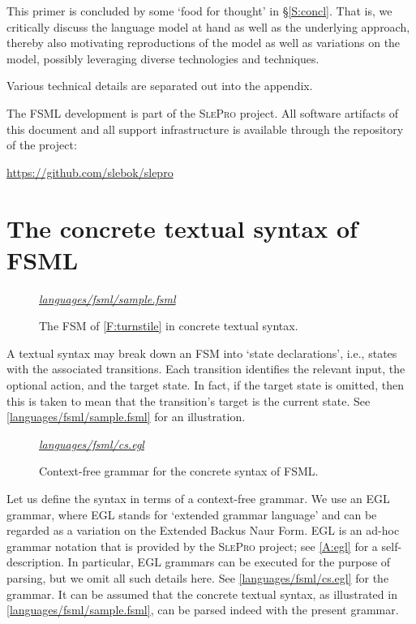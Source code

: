 \documentclass[preprint,authoryear,12pt]{noelsarticle}
\newcommand{\slepro}{\textsc{SlePro}}
\newcommand{\codefigure}[3]{
\begin{figure}[t!]
\begin{boxedminipage}{\hsize}
\mbox{}\hfill{}{\small\textit{\href{http://github.com/slebok/slepro/tree/master/#2}{#2}}}

\end{boxedminipage}
\caption{#1.}
\label{#2}
\medskip
\end{figure}}
\begin{document}
This primer is concluded by some `food for thought' in
\S\ref{S:concl}. That is, we critically discuss the language model at
hand as well as the underlying approach, thereby also motivating
reproductions of the model as well as variations on the model,
possibly leveraging diverse technologies and techniques.

Various technical details are separated out into the appendix.

The FSML development is part of the \slepro{} project. All software
artifacts of this document and all support infrastructure is available
through the repository of the project:

\begin{center}
\url{https://github.com/slebok/slepro}
\end{center}


\section{The concrete textual syntax of FSML}
\label{S:textual}

\codefigure{%
The FSM of \autoref{F:turnstile} in concrete textual syntax}{%
languages/fsml/sample.fsml}{%
fsml}

A textual syntax may break down an FSM into `state declarations',
i.e., states with the associated transitions. Each transition
identifies the relevant input, the optional action, and the target
state. In fact, if the target state is omitted, then this is taken to
mean that the transition's target is the current state. See
\autoref{languages/fsml/sample.fsml} for an illustration.

\codefigure{%
Context-free grammar for the concrete syntax of FSML}{%
languages/fsml/cs.egl}{%
egl}

Let us define the syntax in terms of a context-free grammar. We use an
EGL grammar, where EGL stands for `extended grammar language' and can
be regarded as a variation on the Extended Backus Naur Form. EGL is an
ad-hoc grammar notation that is provided by the \slepro{} project; see
\ref{A:egl} for a self-description. In particular, EGL grammars can
be executed for the purpose of parsing, but we omit all such details
here. See \autoref{languages/fsml/cs.egl} for the grammar. It can be
assumed that the concrete textual syntax, as illustrated in
\autoref{languages/fsml/sample.fsml}, can be parsed indeed
with the present grammar.
\end{document}

